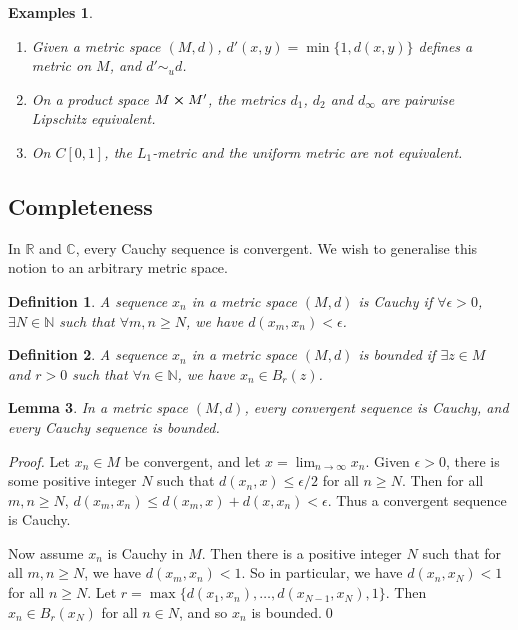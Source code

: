 \documentclass{article}
\theoremstyle{plain}\theoremheaderfont{\normalfont\itshape}\theorembodyfont{\rmfamily}\theoremseparator{.}\newtheorem*{rem}{Remark}\newtheorem*{ex}{Example}\newtheorem*{proof}{Proof}\newtheorem*{altp}{Alternative proof}
\theoremstyle{plain}\theoremheaderfont{\normalfont\bfseries}\theorembodyfont{\rmfamily}\theoremseparator{.}\newtheorem{thm}{Theorem}[section]\newtheorem{lem}[thm]{Lemma}\newtheorem{prop}[thm]{Proposition}\newtheorem*{cor}{Corollary}\newtheorem{defn}[thm]{Definition}\newtheorem{clm}[thm]{Claim}\newtheorem{clminproof}{Claim}
\theoremstyle{break}\theoremheaderfont{\normalfont\itshape}\theorembodyfont{\rmfamily}\theoremseparator{.\medskip}\newtheorem*{proofskip}{Proof}\newtheorem*{exs}{Examples}\newtheorem*{rems}{Remarks}
\theoremstyle{break}\theoremheaderfont{\normalfont\bfseries}\theorembodyfont{\rmfamily}\theoremseparator{.\medskip}\newtheorem{lemskip}[thm]{Lemma}\newtheorem{defnskip}[thm]{Definition}\newtheorem{propskip}[thm]{Proposition}\newtheorem{thmskip}[thm]{Theorem}
\newcommand{\qed}{\hfill\ensuremath{\Box}}
\begin{document}
    \begin{exs}
        \begin{enumerate}[label=(\roman*),topsep=0pt]
            \item Given a metric space \((M,d)\), \(d'(x,y)=\min\{1,d(x,y)\}\) defines a metric on \(M\), and \(d'\sim_u d\).
            \item On a product space \(M\cross M'\), the metrics \(d_1\), \(d_2\) and \(d_\infty\) are pairwise Lipschitz equivalent.
            \item On \(C[0,1]\), the \(L_1\)-metric and the uniform metric are not equivalent.
        \end{enumerate}
    \end{exs}
    \subsection{Completeness}
    In \(\mathbb{R}\) and \(\mathbb{C}\), every Cauchy sequence is convergent. We wish to generalise this notion to an arbitrary metric space.

    \begin{defn}
        A sequence \(x_n\) in a metric space \((M,d)\) is \textit{Cauchy} if \(\forall\epsilon>0\), \(\exists N\in\mathbb{N}\) such that \(\forall m,n\ge N\), we have \(d(x_m,x_n)<\epsilon\).
    \end{defn}

    \begin{defn}
        A sequence \(x_n\) in a metric space \((M,d)\) is \textit{bounded} if \(\exists z\in M\) and \(r>0\) such that \(\forall n\in\mathbb{N}\), we have \(x_n\in B_r(z)\).
    \end{defn}

    \begin{lem}
        In a metric space \((M,d)\), every convergent sequence is Cauchy, and every Cauchy sequence is bounded.
    \end{lem}
    \begin{proof}
        Let \(x_n\in M\) be convergent, and let \(x=\lim_{n\to\infty}x_n\). Given \(\epsilon>0\), there is some positive integer \(N\) such that \(d(x_n,x)\le \epsilon/2\) for all \(n\ge N\). Then for all \(m,n\ge N\), \(d(x_m,x_n)\le d(x_m,x)+d(x,x_n)<\epsilon\). Thus a convergent sequence is Cauchy.

        Now assume \(x_n\) is Cauchy in \(M\). Then there is a positive integer \(N\) such that for all \(m,n\ge N\), we have \(d(x_m,x_n)<1\). So in particular, we have \(d(x_n,x_N)<1\) for all \(n\ge N\). Let \(r=\max\{d(x_1,x_n),\dots,d(x_{N-1},x_N),1\}\). Then \(x_n\in B_r(x_N)\) for all \(n\in N\), and so \(x_n\) is bounded.\qed
    \end{proof}
\end{document}
